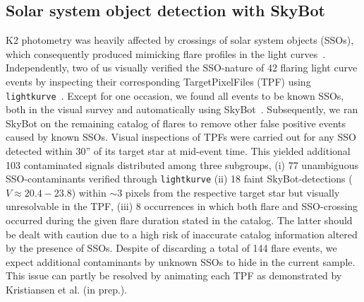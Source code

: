 \documentclass{aa}
\begin{document}
\begin{appendix}
\section{Solar system object detection with SkyBot}
\label{app:skybot}
K2 photometry was heavily affected by crossings of solar system objects (SSOs), which consequently produced mimicking flare profiles in the light curves~\citep{szabo2015}. Independently, two of us visually verified the SSO-nature of 42 flaring light curve events by inspecting their corresponding TargetPixelFiles (TPF) using \texttt{lightkurve}~\citep{lightkurve2018}. Except for one occasion, we found all events to be known SSOs, both in the visual survey and automatically using SkyBot~\citep{berthier2016}. Subsequently, we ran SkyBot on the remaining catalog of flares to remove other false positive events caused by known SSOs. Visual inspections of TPFs were carried out for any SSO detected within 30'' of its target star at mid-event time. This yielded additional 103 contaminated signals distributed among three subgroups, (i) 77 unambiguous SSO-contaminants verified through \texttt{lightkurve} (ii) 18 faint SkyBot-detections ($V\approx 20.4-23.8$) within $\sim3$ pixels from the respective target star but visually unresolvable in the TPF, (iii) 8 occurrences in which both flare and SSO-crossing occurred during the given flare duration stated in the catalog. The latter should be dealt with caution due to a high risk of inaccurate catalog information altered by the presence of SSOs. Despite of discarding a total of 144 flare events, we expect additional contaminants by unknown SSOs to hide in the current sample. This issue can partly be resolved by animating each TPF as demonstrated by Kristiansen et al. (in prep.). 

\end{appendix}
\end{document}
